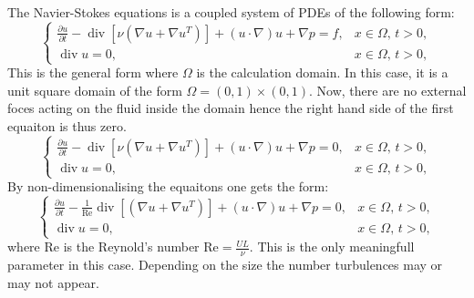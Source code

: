 \documentclass[a4paper, 11pt]{article}
\begin{document}
The Navier-Stokes equations is a coupled system of PDEs  of the following form:
\begin{equation}
\begin{cases}
  \frac{\partial u}{\partial t} - \operatorname{div}\left[\nu\left(\nabla u + \nabla u^T\right)\right] + (u \cdot \nabla)u + \nabla p = f, & x \in \Omega, \, t > 0, \\[5pt]
  \operatorname{div} u = 0, & x \in \Omega, \, t > 0,
\end{cases}
\end{equation}
This is the general form where $\Omega$ is the calculation domain. In this case, it is a unit square
domain of the form $\Omega = (0, 1)\times(0, 1)$. Now, there are no external foces acting on the
fluid inside the domain hence the right hand side of the first equaiton is thus zero.
\begin{equation}
\begin{cases}
  \frac{\partial u}{\partial t} - \operatorname{div}\left[\nu\left(\nabla u + \nabla u^T\right)\right] + (u \cdot \nabla)u + \nabla p = 0, & x \in \Omega, \, t > 0, \\[5pt]
  \operatorname{div} u = 0, & x \in \Omega, \, t > 0,
\end{cases}
\end{equation}
By non-dimensionalising the equaitons one gets the form:
\begin{equation}
\begin{cases}
  \frac{\partial u}{\partial t} - \frac{1}{\mathrm{Re}}\operatorname{div}\left[\left(\nabla u + \nabla u^T\right)\right] + (u \cdot \nabla)u + \nabla p = 0, & x \in \Omega, \, t > 0, \\[5pt]
  \operatorname{div} u = 0, & x \in \Omega, \, t > 0,
\end{cases}
\end{equation}
where Re is the Reynold's number $\mathrm{Re} = \frac{UL}{\nu}$. This is the only meaningfull
parameter in this case. Depending on the size the number turbulences may or may not appear.
\end{document}

